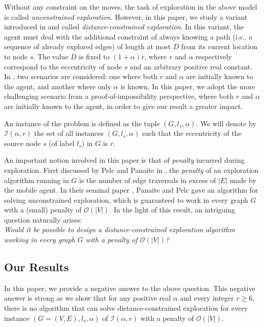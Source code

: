 \documentclass[11pt]{article}
\begin{document}
Without any constraint on the moves, the task of exploration in the above model is called \emph{unconstrained exploration}. However, in this paper, we study a variant introduced in \cite{DuncanKK06} and called \emph{distance-constrained exploration}. In this variant, the agent must deal with the additional constraint of always knowing a path (i.e., a sequence of already explored edges) of length at most $D$ from its current location to node $s$. The value $D$ is fixed to $(1+\alpha)r$, where $r$ and $\alpha$ respectively correspond to the eccentricity of node $s$ and an arbitrary positive real constant.  In \cite{DuncanKK06}, two scenarios are considered: one where both $r$ and $\alpha$ are initially known to the agent, and another where only $\alpha$ is known. In this paper, we adopt the more challenging scenario from a proof-of-impossibility perspective, where both $r$ and $\alpha$ are initially known to the agent, in order to give our result a greater impact.

An instance of the problem is defined as the tuple $(G,l_s,\alpha)$. We will denote by $\mathcal{I}(\alpha,r)$ the set of all instances $(G,l_s,\alpha)$ such that the eccentricity of the source node $s$ (of label $l_s$) in $G$ is $r$. 

An important notion involved in this paper is that of \emph{penalty}
incurred during exploration. First discussed by Pelc and Panaite in
\cite{PanaiteP99}, the \emph{penalty} of an exploration algorithm
running in $G$ is the number of edge traversals in excess of
$|E|$ made by the  mobile agent. In their seminal paper
\cite{PanaiteP99}, Panaite and Pelc gave an algorithm for solving
unconstrained exploration, which is guaranteed to work in every graph
$G$ with a (small) penalty of $\mathcal{O}(|V|)$. In the light of this result, an intriguing question naturally arises: \\

{\it Would it be possible to design a distance-constrained exploration algorithm working in every graph $G$ with a penalty of $\mathcal{O}(|V|)$?}

\subsection{Our Results}
\label{sec:ourresults}
In this paper, we provide a negative answer to the above question. This negative answer is strong as we show that for any positive real $\alpha$ and every integer $r\geq 6$, there is no algorithm that can solve distance-constrained exploration for every instance $(G=(V,E),l_s,\alpha)$ of $\mathcal{I}(\alpha,r)$ with a penalty of $\mathcal{O}(|V|)$. %
\end{document}
